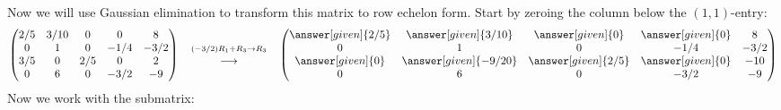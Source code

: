 \documentclass{ximera}
\begin{document}
\begin{example}
\begin{explanation}
Now we will use Gaussian elimination to transform this matrix to row echelon form. Start by zeroing the column below the $(1,1)$-entry:
\[
  \begin{pmatrix}
    {2/5}&  {3/10} & {0} &{0} &8 \\
    {0}&  {1} & {0} &{-1/4} & -3/2\\
    {3/5}&  {0} & {2/5} &{0} &2\\
    {0}&  {6} & {0} &{-3/2} &-9
  \end{pmatrix}
  \quad
  \begin{matrix}
    \scriptstyle(-3/2) R_1 + R_3\to R_3\\
    \longrightarrow
  \end{matrix}
  \quad
  \begin{pmatrix}
    \answer[given]{2/5}&  \answer[given]{3/10} & \answer[given]{0} &\answer[given]{0} &8 \\
    {0}&  {1} & {0} &{-1/4} & -3/2\\
    \answer[given]{0}&  \answer[given]{-9/20} & \answer[given]{2/5} &\answer[given]{0} &-10\\
    {0}&  {6} & {0} &{-3/2} &-9
  \end{pmatrix}
\]
Now we work with the submatrix:
\begin{center}
\end{center}


\end{explanation}
\end{example}
\end{document}
